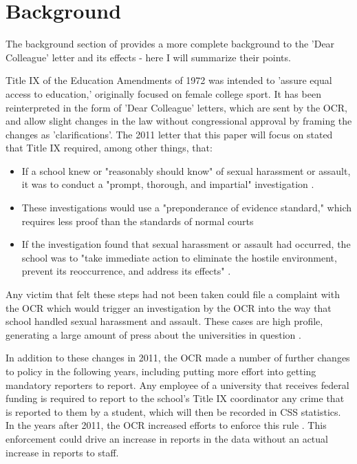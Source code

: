 \documentclass[AER]{AEA}
\begin{document}
\section{Background}

The background section of \cite{lindo_any_2018} provides a more complete background to the 'Dear Colleague' letter and its effects - here I will summarize their points. 

Title IX of the Education Amendments of 1972 was intended to 'assure equal access to education,' originally focused on female college sport. It has been reinterpreted in the form of 'Dear Colleague' letters, which are sent by the OCR, and allow slight changes in the law without congressional approval by framing the changes as 'clarifications'. The 2011 letter that this paper will focus on stated that Title IX required, among other things, that:

\begin{itemize}

\item If a school knew or "reasonably should know" of sexual harassment or assault, it was to conduct a "prompt, thorough, and impartial" investigation \cite{ali_dear_2011}.

\item These investigations would use a "preponderance of evidence standard," which requires less proof than the standards of normal courts \cite{lindo_any_2018}

\item If the investigation found that sexual harassment or assault had occurred, the school was to "take immediate action to eliminate the hostile environment, prevent its reoccurrence, and address its effects"  \cite{ali_dear_2011}. 

\end{itemize}

Any victim that felt these steps had not been taken could file a complaint with the OCR which would trigger an investigation by the OCR into the way that school handled sexual harassment and assault. These cases are high profile, generating a large amount of press about the universities in question \cite{lindo_any_2018}. 

In addition to these changes in 2011, the OCR made a number of further changes to policy in the following years, including putting more effort into getting mandatory reporters to report. Any employee of a university that receives federal funding is required to report to the school's Title IX coordinator any crime that is reported to them by a student, which will then be recorded in CSS statistics. In the years after 2011, the OCR increased efforts to enforce this rule . This enforcement could drive an increase in reports in the data without an actual increase in reports to staff.
\end{document}
